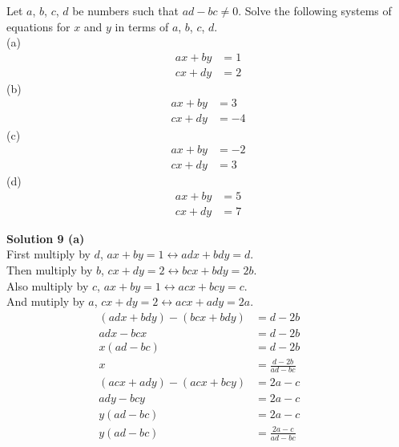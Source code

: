\begin{tcolorbox}[title=Problem 9, breakable]
    Let $a$, $b$, $c$, $d$ be numbers such that $ad - bc \not = 0$. Solve 
    the following systems of equations for $x$ and $y$ in terms of 
    $a$, $b$, $c$, $d$. \\
    (a) \begin{align*}
            ax + by &= 1 \\
            cx + dy &= 2
        \end{align*}
    (b) \begin{align*}
            ax + by &= 3 \\
            cx + dy &= -4
        \end{align*}
    (c) \begin{align*}
            ax + by &= -2 \\
            cx + dy &= 3 
        \end{align*}
    (d) \begin{align*}
            ax + by &= 5 \\
            cx + dy &= 7
        \end{align*}
\end{tcolorbox}

\textbf{Solution 9 (a)} \\
First multiply by $d$, $ax + by = 1 \leftrightarrow adx + bdy = d$. \\
Then multiply by $b$, $cx + dy = 2 \leftrightarrow bcx + bdy = 2b$. \\
Also multiply by $c$, $ax + by = 1 \leftrightarrow acx + bcy = c$. \\
And mutiply by $a$, $cx + dy  = 2 \leftrightarrow acx + ady = 2a$. 
\begin{align*}
    (adx + bdy) - (bcx + bdy) &= d - 2b && \\
    adx - bcx &= d - 2b && \\
    x(ad - bc) &= d - 2b && \\
    x &= \frac{d - 2b}{ad - bc}
\end{align*}
\begin{align*}
    (acx + ady) - (acx + bcy) &= 2a - c && \\
    ady - bcy &= 2a - c && \\
    y(ad - bc) &= 2a - c && \\
    y(ad - bc) &= \frac{2a - c}{ad - bc} 
\end{align*}

